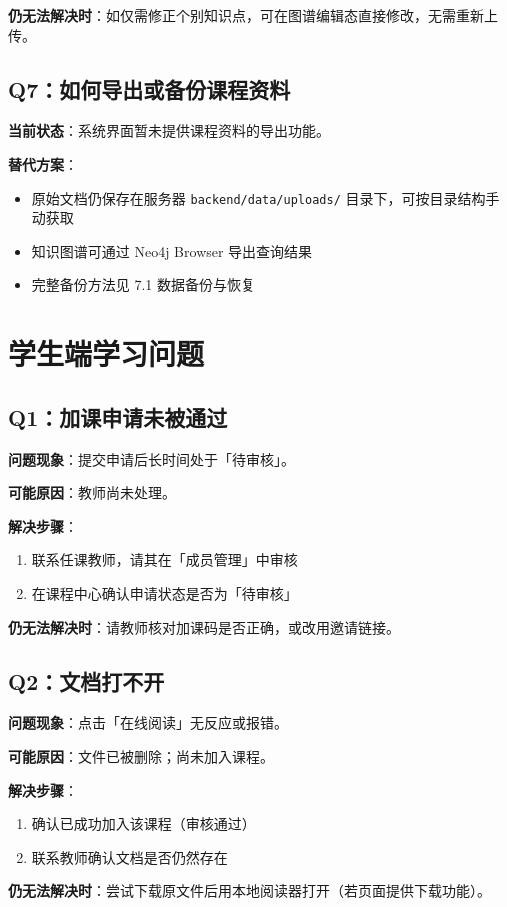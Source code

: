 \documentclass[UTF8,a4paper,11pt]{ctexrep}
\begin{document}
\textbf{仍无法解决时}：如仅需修正个别知识点，可在图谱编辑态直接修改，无需重新上传。


\subsection{Q7：如何导出或备份课程资料}

\textbf{当前状态}：系统界面暂未提供课程资料的导出功能。

\textbf{替代方案}：

\begin{itemize}
\item 原始文档仍保存在服务器 \texttt{backend/data/uploads/} 目录下，可按目录结构手动获取
\item 知识图谱可通过 Neo4j Browser 导出查询结果
\item 完整备份方法见 7.1 数据备份与恢复
\end{itemize}

\section{学生端学习问题}


\subsection{Q1：加课申请未被通过}

\textbf{问题现象}：提交申请后长时间处于「待审核」。

\textbf{可能原因}：教师尚未处理。

\textbf{解决步骤}：

\begin{enumerate}
\item 联系任课教师，请其在「成员管理」中审核
\item 在课程中心确认申请状态是否为「待审核」
\end{enumerate}
\textbf{仍无法解决时}：请教师核对加课码是否正确，或改用邀请链接。


\subsection{Q2：文档打不开}

\textbf{问题现象}：点击「在线阅读」无反应或报错。

\textbf{可能原因}：文件已被删除；尚未加入课程。

\textbf{解决步骤}：

\begin{enumerate}
\item 确认已成功加入该课程（审核通过）
\item 联系教师确认文档是否仍然存在
\end{enumerate}
\textbf{仍无法解决时}：尝试下载原文件后用本地阅读器打开（若页面提供下载功能）。
\end{document}
